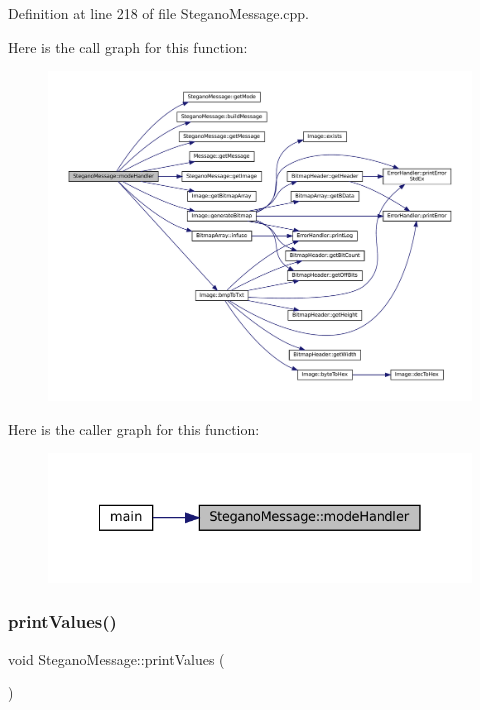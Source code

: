 Definition at line 218 of file Stegano\+Message.\+cpp.

Here is the call graph for this function\+:
\nopagebreak
\begin{figure}[H]
\begin{center}
\leavevmode
\includegraphics[width=350pt]{classSteganoMessage_a2649e515941e730520b759282d00dcd6_cgraph}
\end{center}
\end{figure}
Here is the caller graph for this function\+:
\nopagebreak
\begin{figure}[H]
\begin{center}
\leavevmode
\includegraphics[width=328pt]{classSteganoMessage_a2649e515941e730520b759282d00dcd6_icgraph}
\end{center}
\end{figure}
\mbox{\label{classSteganoMessage_a3ea3f5ff720bf56d33f168d47e2897b0}} 
\subsubsection{\texorpdfstring{printValues()}{printValues()}}
{\footnotesize\ttfamily void Stegano\+Message\+::print\+Values (\begin{DoxyParamCaption}{ }\end{DoxyParamCaption})}



